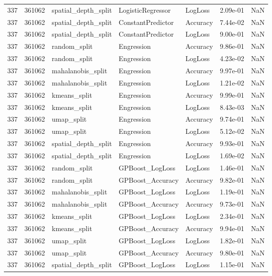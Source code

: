 \begin{tabular}{rrlllrr}
337 & 361062 & spatial\_depth\_split & LogisticRegressor & LogLoss & 2.09e-01 & NaN \\
337 & 361062 & spatial\_depth\_split & ConstantPredictor & Accuracy & 7.44e-02 & NaN \\
337 & 361062 & spatial\_depth\_split & ConstantPredictor & LogLoss & 9.00e-01 & NaN \\
337 & 361062 & random\_split & Engression & Accuracy & 9.86e-01 & NaN \\
337 & 361062 & random\_split & Engression & LogLoss & 4.23e-02 & NaN \\
337 & 361062 & mahalanobis\_split & Engression & Accuracy & 9.97e-01 & NaN \\
337 & 361062 & mahalanobis\_split & Engression & LogLoss & 1.21e-02 & NaN \\
337 & 361062 & kmeans\_split & Engression & Accuracy & 9.99e-01 & NaN \\
337 & 361062 & kmeans\_split & Engression & LogLoss & 8.43e-03 & NaN \\
337 & 361062 & umap\_split & Engression & Accuracy & 9.74e-01 & NaN \\
337 & 361062 & umap\_split & Engression & LogLoss & 5.12e-02 & NaN \\
337 & 361062 & spatial\_depth\_split & Engression & Accuracy & 9.93e-01 & NaN \\
337 & 361062 & spatial\_depth\_split & Engression & LogLoss & 1.69e-02 & NaN \\
337 & 361062 & random\_split & GPBoost\_LogLoss & LogLoss & 1.46e-01 & NaN \\
337 & 361062 & random\_split & GPBoost\_Accuracy & Accuracy & 9.82e-01 & NaN \\
337 & 361062 & mahalanobis\_split & GPBoost\_LogLoss & LogLoss & 1.19e-01 & NaN \\
337 & 361062 & mahalanobis\_split & GPBoost\_Accuracy & Accuracy & 9.73e-01 & NaN \\
337 & 361062 & kmeans\_split & GPBoost\_LogLoss & LogLoss & 2.34e-01 & NaN \\
337 & 361062 & kmeans\_split & GPBoost\_Accuracy & Accuracy & 9.94e-01 & NaN \\
337 & 361062 & umap\_split & GPBoost\_LogLoss & LogLoss & 1.82e-01 & NaN \\
337 & 361062 & umap\_split & GPBoost\_Accuracy & Accuracy & 9.80e-01 & NaN \\
337 & 361062 & spatial\_depth\_split & GPBoost\_LogLoss & LogLoss & 1.15e-01 & NaN \\

\end{tabular}
